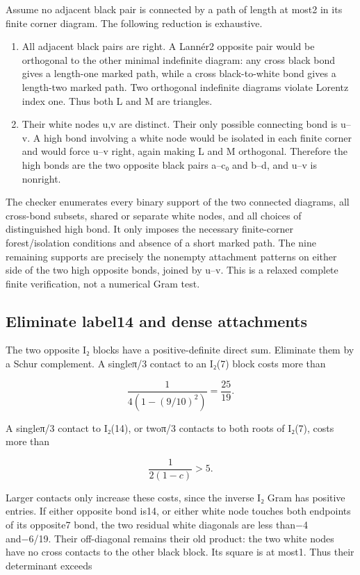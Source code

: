 \documentclass[
  10pt,
]{report}
\newcounter{none} %
\providecommand{\tightlist}{%
  \setlength{\itemsep}{0pt}\setlength{\parskip}{0pt}}
\begin{document}
Assume no adjacent black pair is connected by a path of length at most2
in its finite corner diagram. The following reduction is exhaustive.

\begin{enumerate}
\def\labelenumi{\arabic{enumi}.}
\tightlist
\item
  All adjacent black pairs are right. A Lannér2 opposite pair would be
  orthogonal to the other minimal indefinite diagram: any cross black
  bond gives a length-one marked path, while a cross black-to-white bond
  gives a length-two marked path. Two orthogonal indefinite diagrams
  violate Lorentz index one. Thus both L and M are triangles.
\item
  Their white nodes u,v are distinct. Their only possible connecting
  bond is u--v. A high bond involving a white node would be isolated in
  each finite corner and would force u--v right, again making L and M
  orthogonal. Therefore the high bonds are the two opposite black pairs
  a--c₀ and b--d, and u--v is nonright.
\end{enumerate}

The checker enumerates every binary support of the two connected
diagrams, all cross-bond subsets, shared or separate white nodes, and
all choices of distinguished high bond. It only imposes the necessary
finite-corner forest/isolation conditions and absence of a short marked
path. The nine remaining supports are precisely the nonempty attachment
patterns on either side of the two high opposite bonds, joined by u--v.
This is a relaxed complete finite verification, not a numerical Gram
test.

\subsection{Eliminate label14 and dense
attachments}\label{eliminate-label14-and-dense-attachments}

The two opposite I₂ blocks have a positive-definite direct sum.
Eliminate them by a Schur complement. A singleπ/3 contact to an I₂(7)
block costs more than

\[
 \frac{1}{4(1-(9/10)^2)}=\frac{25}{19}.
\]

A singleπ/3 contact to I₂(14), or twoπ/3 contacts to both roots of
I₂(7), costs more than

\[
 \frac1{2(1-c)}>5.
\]

Larger contacts only increase these costs, since the inverse I₂ Gram has
positive entries. If either opposite bond is14, or either white node
touches both endpoints of its opposite7 bond, the two residual white
diagonals are less than−4 and−6/19. Their off-diagonal remains their old
product: the two white nodes have no cross contacts to the other black
block. Its square is at most1. Thus their determinant exceeds
\end{document}
